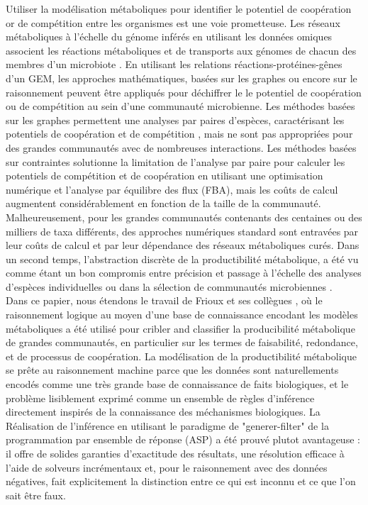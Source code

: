 Utiliser la modélisation métaboliques pour identifier le potentiel de coopération or de compétition entre les organismes est une voie prometteuse. Les réseaux métaboliques à l'échelle du génome inférés en utilisant les données omiques associent les réactions métaboliques et de transports aux génomes de chacun des membres d'un microbiote \citep{Ankrah.2021}. En utilisant les relations réactions-protéines-gênes d'un GEM, les approches mathématiques, basées sur les graphes ou encore sur le raisonnement peuvent être appliqués pour déchiffrer le le potentiel de coopération ou de compétition au sein d'une communauté microbienne. Les méthodes basées sur les graphes permettent une analyses par paires d'espèces, caractérisant les potentiels de coopération \citep{Levy2015} et de compétition \citep{Kreimer2012}, mais ne sont pas appropriées pour des grandes communautés avec de nombreuses interactions. Les méthodes basées sur contraintes \citep{Zelezniak2015,diener2020} solutionne la limitation de l'analyse par paire pour calculer les potentiels de compétition et de coopération en utilisant une optimisation numérique et l'analyse par équilibre des flux (FBA), mais les coûts de calcul augmentent considérablement en fonction de la taille de la communauté. Malheureusement, pour les grandes communautés contenants des centaines ou des milliers de taxa différents, des approches numériques standard sont entravées par leur coûts de calcul et par leur dépendance des réseaux métaboliques curés. Dans un second temps, l'abstraction discrète de la productibilité métabolique, a été vu comme étant un bon compromis entre précision et passage à l'échelle des analyses d'espèces individuelles ou dans la sélection de communautés microbiennes \citep{Belcour.2020,Frioux2018}.\\

Dans ce papier, nous étendons le travail de Frioux et ses collègues \citep{Frioux2018}, où le raisonnement logique au moyen d'une base de connaissance encodant les modèles métaboliques a été utilisé pour cribler and classifier la producibilité métabolique de grandes communautés, en particulier sur les termes de faisabilité, redondance, et de processus de coopération. La modélisation de la productibilité métabolique se prête au raisonnement machine parce que les données sont naturellements encodés comme une très grande base de connaissance de faits biologiques, et le problème lisiblement exprimé comme un ensemble de règles d'inférence directement inspirés de la connaissance des méchanismes biologiques. La Réalisation de l'inférence en utilisant le paradigme de "generer-filter" de la programmation par ensemble de réponse (ASP) \citep{Lifschitz2008} a été prouvé plutot avantageuse : il offre de solides garanties d'exactitude des résultats, une résolution efficace à l'aide de solveurs incrémentaux et, pour le raisonnement avec des données négatives, fait explicitement la distinction entre ce qui est inconnu et ce que l'on sait être faux. \\

